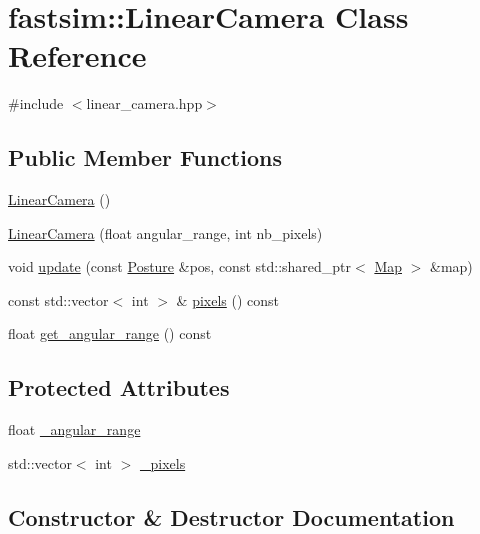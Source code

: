 \hypertarget{classfastsim_1_1_linear_camera}{}\section{fastsim\+:\+:Linear\+Camera Class Reference}
\label{classfastsim_1_1_linear_camera}


{\ttfamily \#include $<$linear\+\_\+camera.\+hpp$>$}

\subsection*{Public Member Functions}
\begin{DoxyCompactItemize}
\item 
\hyperlink{classfastsim_1_1_linear_camera_ac9accb315ca2a9230ebbe62f64f5c107}{Linear\+Camera} ()
\item 
\hyperlink{classfastsim_1_1_linear_camera_a1bd6db6703d4a4f99fe84c146ff3b97e}{Linear\+Camera} (float angular\+\_\+range, int nb\+\_\+pixels)
\item 
void \hyperlink{classfastsim_1_1_linear_camera_aecb7eb447e9b453642ea6684e69c528d}{update} (const \hyperlink{classfastsim_1_1_posture}{Posture} \&pos, const std\+::shared\+\_\+ptr$<$ \hyperlink{classfastsim_1_1_map}{Map} $>$ \&map)
\item 
const std\+::vector$<$ int $>$ \& \hyperlink{classfastsim_1_1_linear_camera_af75a35f016bd4cae12b30d28c8e0fcd8}{pixels} () const 
\item 
float \hyperlink{classfastsim_1_1_linear_camera_a94f5152d3ee7d3d6cfee102b4fec44bb}{get\+\_\+angular\+\_\+range} () const 
\end{DoxyCompactItemize}
\subsection*{Protected Attributes}
\begin{DoxyCompactItemize}
\item 
float \hyperlink{classfastsim_1_1_linear_camera_aaeead77c6003ac991eb68ea899daebaa}{\+\_\+angular\+\_\+range}
\item 
std\+::vector$<$ int $>$ \hyperlink{classfastsim_1_1_linear_camera_aa82ccbc534ad540de0928aefc5d1cf01}{\+\_\+pixels}
\end{DoxyCompactItemize}


\subsection{Constructor \& Destructor Documentation}
